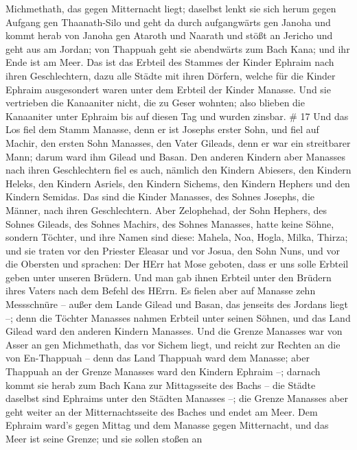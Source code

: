 Michmethath, das gegen Mitternacht liegt; daselbst lenkt sie sich herum
gegen Aufgang gen Thaanath-Silo und geht da durch aufgangwärts gen
Janoha  und kommt herab von Janoha gen Ataroth und Naarath
und stößt an Jericho und geht aus am Jordan;  von Thappuah
geht sie abendwärts zum Bach Kana; und ihr Ende ist am Meer. Das ist das
Erbteil des Stammes der Kinder Ephraim nach ihren Geschlechtern,
 dazu alle Städte mit ihren Dörfern, welche für die Kinder
Ephraim ausgesondert waren unter dem Erbteil der Kinder Manasse.
 Und sie vertrieben die Kanaaniter nicht, die zu Geser
wohnten; also blieben die Kanaaniter unter Ephraim bis auf diesen Tag
und wurden zinsbar. \# 17  Und das Los fiel dem Stamm
Manasse, denn er ist Josephs erster Sohn, und fiel auf Machir, den
ersten Sohn Manasses, den Vater Gileads, denn er war ein streitbarer
Mann; darum ward ihm Gilead und Basan.  Den anderen Kindern
aber Manasses nach ihren Geschlechtern fiel es auch, nämlich den Kindern
Abiesers, den Kindern Heleks, den Kindern Asriels, den Kindern Sichems,
den Kindern Hephers und den Kindern Semidas. Das sind die Kinder
Manasses, des Sohnes Josephs, die Männer, nach ihren Geschlechtern.
 Aber Zelophehad, der Sohn Hephers, des Sohnes Gileads, des
Sohnes Machirs, des Sohnes Manasses, hatte keine Söhne, sondern Töchter,
und ihre Namen sind diese: Mahela, Noa, Hogla, Milka, Thirza;
 und sie traten vor den Priester Eleasar und vor Josua, den
Sohn Nuns, und vor die Obersten und sprachen: Der HErr hat Mose geboten,
dass er uns solle Erbteil geben unter unseren Brüdern. Und man gab ihnen
Erbteil unter den Brüdern ihres Vaters nach dem Befehl des HErrn.
 Es fielen aber auf Manasse zehn Messschnüre -- außer dem
Lande Gilead und Basan, das jenseits des Jordans liegt --; 
denn die Töchter Manasses nahmen Erbteil unter seinen Söhnen, und das
Land Gilead ward den anderen Kindern Manasses.  Und die
Grenze Manasses war von Asser an gen Michmethath, das vor Sichem liegt,
und reicht zur Rechten an die von En-Thappuah --  denn das
Land Thappuah ward dem Manasse; aber Thappuah an der Grenze Manasses
ward den Kindern Ephraim --;  darnach kommt sie herab zum
Bach Kana zur Mittagsseite des Bachs -- die Städte daselbst sind
Ephraims unter den Städten Manasses --; die Grenze Manasses aber geht
weiter an der Mitternachtsseite des Baches und endet am Meer.
 Dem Ephraim ward's gegen Mittag und dem Manasse gegen
Mitternacht, und das Meer ist seine Grenze; und sie sollen stoßen an
